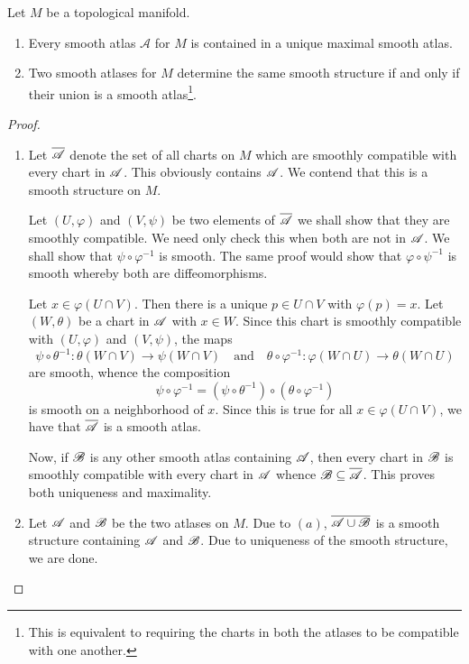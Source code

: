 \begin{proposition}
    Let $M$ be a topological manifold. 
    \begin{enumerate}[label=(\alph*)]
        \item Every smooth atlas $\mathscr A$ for $M$ is contained in a unique maximal smooth atlas. 
        \item Two smooth atlases for $M$ determine the same smooth structure if and only if their union is a smooth atlas\footnote{This is equivalent to requiring the charts in both the atlases to be compatible with one another.}.
    \end{enumerate}
\end{proposition}
\begin{proof}
\begin{enumerate}[label=(\alph*)]
    \item Let $\overline{\mathscr A}$ denote the set of all charts on $M$ which are smoothly compatible with every chart in $\mathscr A$. This obviously contains $\mathscr A$. We contend that this is a smooth structure on $M$. 

    Let $(U,\varphi)$ and $(V,\psi)$ be two elements of $\overline{\mathscr A}$ we shall show that they are smoothly compatible. We need only check this when both are not in $\mathscr A$. We shall show that $\psi\circ\varphi^{-1}$ is smooth. The same proof would show that $\varphi\circ\psi^{-1}$ is smooth whereby both are diffeomorphisms.

    Let $x\in\varphi(U\cap V)$. Then there is a unique $p\in U\cap V$ with $\varphi(p) = x$. Let $(W,\theta)$ be a chart in $\mathscr A$ with $x\in W$. Since this chart is smoothly compatible with $(U,\varphi)$ and $(V,\psi)$, the maps 
    \begin{equation*}
        \psi\circ\theta^{-1}:\theta(W\cap V)\to\psi(W\cap V)\quad\text{and}\quad\theta\circ\varphi^{-1}:\varphi(W\cap U)\to\theta(W\cap U)
    \end{equation*}
    are smooth, whence the composition 
    \begin{equation*}
        \psi\circ\varphi^{-1} = (\psi\circ\theta^{-1})\circ(\theta\circ\varphi^{-1})
    \end{equation*}
    is smooth on a neighborhood of $x$. Since this is true for all $x\in\varphi(U\cap V)$, we have that $\overline{\mathscr A}$ is a smooth atlas. 

    Now, if $\mathscr B$ is any other smooth atlas containing $\mathscr A$, then every chart in $\mathscr B$ is smoothly compatible with every chart in $\mathscr A$ whence $\mathscr B\subseteq\overline{\mathscr A}$. This proves both uniqueness and maximality.

    \item Let $\mathscr A$ and $\mathscr B$ be the two atlases on $M$. Due to $(a)$, $\overline{\mathscr A\cup\mathscr B}$ is a smooth structure containing $\mathscr A$ and $\mathscr B$. Due to uniqueness of the smooth structure, we are done.
\end{enumerate}
\end{proof}

